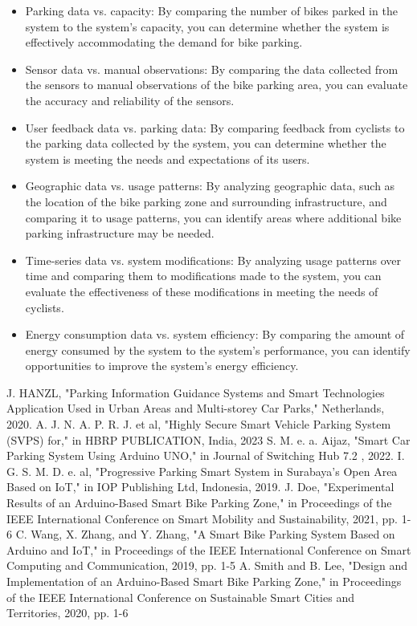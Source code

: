 \documentclass[conference]{IEEEtran}
\begin{document}
	 	\begin{itemize}
	 	\item Parking data vs. capacity: 
	 	By comparing the number of bikes parked in the system to the system's capacity, you can determine whether the system is effectively accommodating the demand for bike parking.
	 	\item Sensor data vs. manual observations: 
	 	By comparing the data collected from the sensors to manual observations of the bike parking area, you can evaluate the accuracy and reliability of the sensors.
	 	\item User feedback data vs. parking data: 
	 	By comparing feedback from cyclists to the parking data collected by the system, you can determine whether the system is meeting the needs and expectations of its users.
	 	\item Geographic data vs. usage patterns: 
	 	By analyzing geographic data, such as the location of the bike parking zone and surrounding infrastructure, and comparing it to usage patterns, you can identify areas where additional bike parking infrastructure may be needed.\cite{b6}
	 	\item Time-series data vs. system modifications: 
	 	By analyzing usage patterns over time and comparing them to modifications made to the system, you can evaluate the effectiveness of these modifications in meeting the needs of cyclists. 	
	 	\item Energy consumption data vs. system efficiency:
	 	By comparing the amount of energy consumed by the system to the system's performance, you can identify opportunities to improve the system's energy efficiency.
	 \end{itemize}
	 

	
\begin{thebibliography}{00}
 J. HANZL, "Parking Information Guidance Systems and Smart Technologies Application Used in Urban Areas and Multi-storey Car Parks," Netherlands, 2020. 
 A. J. N. A. P. R. J. et al, "Highly Secure Smart Vehicle Parking System (SVPS) for," in HBRP PUBLICATION, India, 2023 
 S. M. e. a. Aijaz, "Smart Car Parking System Using Arduino UNO," in Journal of Switching Hub 7.2 , 2022. 
	I. G. S. M. D. e. al, "Progressive Parking Smart System in Surabaya's Open Area Based on IoT," in IOP Publishing Ltd, Indonesia, 2019. 
 J. Doe, "Experimental Results of an Arduino-Based Smart Bike Parking Zone," in Proceedings of the IEEE International Conference on Smart Mobility and Sustainability, 2021, pp. 1-6
 C. Wang, X. Zhang, and Y. Zhang, "A Smart Bike Parking System Based on Arduino and IoT," in Proceedings of the IEEE International Conference on Smart Computing and Communication, 2019, pp. 1-5
A. Smith and B. Lee, "Design and Implementation of an Arduino-Based Smart Bike Parking Zone," in Proceedings of the IEEE International Conference on Sustainable Smart Cities and Territories, 2020, pp. 1-6
\end{thebibliography}
\end{document}
